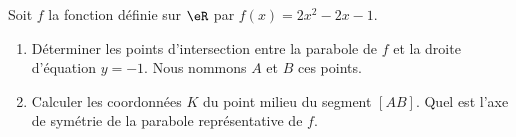 
\begin{exercice}\label{exosmath-0391}

    Soit $f$ la fonction définie sur \( \eR\) par \( f(x)=2x^2-2x-1\).
    \begin{enumerate}
        \item
            Déterminer les points d'intersection entre la parabole de \( f\) et la droite d'équation \( y=-1\). Nous nommons \( A\) et \( B\) ces points.
        \item
            Calculer les coordonnées \( K\) du point milieu du segment \( [AB]\). Quel est l'axe de symétrie de la parabole représentative de \( f\).
    \end{enumerate}


\end{exercice}
